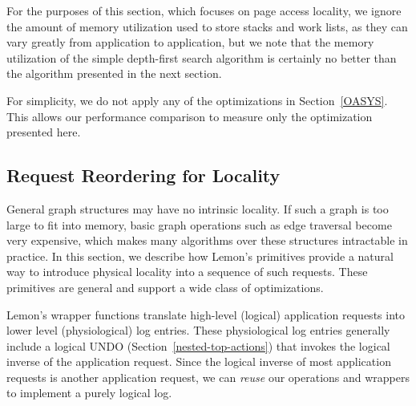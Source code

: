 \documentclass[10pt,letterpaper,twocolumn,english]{article}
\newcommand{\yad}{Lemon\xspace}
\begin{document}
For the purposes of this section, which focuses on page access
locality, we ignore the amount of memory utilization used to store
stacks and work lists, as they can vary greatly from application to
application, but we note that the memory utilization of the simple
depth-first search algorithm is certainly no better than the algorithm
presented in the next section.

For simplicity, we do not apply any of the optimizations in
Section~\ref{OASYS}.  This allows our performance comparison to
 measure only the optimization presented here.

\subsection {Request Reordering for Locality}

General graph structures may have no intrinsic locality.  If such a
graph is too large to fit into memory, basic graph operations such as
edge traversal become very expensive, which makes many algorithms over
these structures intractable in practice.  In this section, we
describe how \yad's primitives provide a natural way to introduce
physical locality into a sequence of such requests.  These primitives
are general and support a wide class of optimizations.

\yad's wrapper functions translate high-level (logical) application
requests into lower level (physiological) log entries.  These
physiological log entries generally include a logical UNDO
(Section~\ref{nested-top-actions}) that invokes the logical
inverse of the application request.  Since the logical inverse of most
application requests is another application request, we can {\em reuse} our
operations and wrappers to implement a purely logical log.
\end{document}
